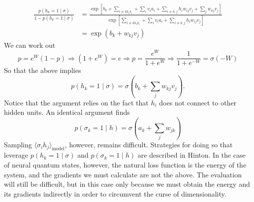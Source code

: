 \documentclass{article}
\begin{document}
\begin{align*}
	\frac{p(h_k=1\mid \sigma)}{1-p(h_k=1\mid \sigma)}
		&= \frac{
			\exp\left[b_k + \sum_{i\neq k h_i b_i} + \sum_i v_i a_i 
			+ \sum_{i\neq k, j}h_i w_{ij} v_j
				+ \sum_j w_{kj} v_j\right]
		}{
			\exp\left[\sum_{i\neq k h_i b_i} + \sum_i v_i a_i 
			+ \sum_{i\neq k, j}h_i w_{ij} v_j\right]
		}
		\\
		&=\exp\left(b_k + w_{kj} v_j\right)
\end{align*}
We can work out
\begin{equation*}
	p = e^W (1-p) \Longrightarrow (1+e^W) = e \Longrightarrow 
	p = \frac{e^W}{1 + e^W } \Longrightarrow \frac{1}{1+e^{-W}} = \sigma(-W)
\end{equation*}
So that the above implies
\begin{equation*}
	p(h_k = 1\mid \sigma) = \sigma(b_k + \sum_{j} w_{kj}v_j).
\end{equation*}
Notice that the argument relies on the fact that $ h_i $ does not connect 
to other hidden units. An identical argument finds 
\begin{equation*}
	p(\sigma_k = 1 \mid h) = \sigma(a_k + \sum_j w_{jk} )
\end{equation*}
Sampling $ \langle \sigma_i h_j\rangle_{\text{model}} $, however, remains
difficult. Strategies for doing so that leverage $ p(h_k=1\mid \sigma) $ and 
$ p(\sigma_k = 1\mid h) $ are described in Hinton. In the case of neural quantum 
states, however, the natural loss function is the energy of the system, and 
the gradients we must calculate are not the above. The evaluation will still 
be difficult, but in this case only because we must obtain the energy and its 
gradients indirectly in order to circumvent the curse of dimensionality. 
\end{document}
